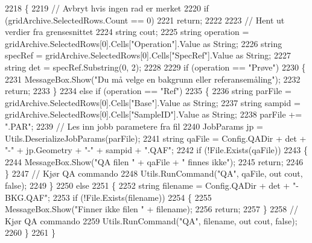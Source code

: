 \begin{DoxyCode}
2218         \{
2219             \textcolor{comment}{// Avbryt hvis ingen rad er merket}
2220             \textcolor{keywordflow}{if} (gridArchive.SelectedRows.Count == 0)
2221                 \textcolor{keywordflow}{return};
2222 
2223             \textcolor{comment}{// Hent ut verdier fra grensesnittet}
2224             \textcolor{keywordtype}{string} cout;
2225             \textcolor{keywordtype}{string} operation = gridArchive.SelectedRows[0].Cells[\textcolor{stringliteral}{"Operation"}].Value as String;
2226             \textcolor{keywordtype}{string} specRef = gridArchive.SelectedRows[0].Cells[\textcolor{stringliteral}{"SpecRef"}].Value as String;
2227             \textcolor{keywordtype}{string} det = specRef.Substring(0, 2);
2228 
2229             \textcolor{keywordflow}{if} (operation == \textcolor{stringliteral}{"Prøve"})
2230             \{
2231                 MessageBox.Show(\textcolor{stringliteral}{"Du må velge en bakgrunn eller referansemåling"});
2232                 \textcolor{keywordflow}{return};
2233             \}
2234             \textcolor{keywordflow}{else} \textcolor{keywordflow}{if} (operation == \textcolor{stringliteral}{"Ref"})
2235             \{
2236                 \textcolor{keywordtype}{string} parFile = gridArchive.SelectedRows[0].Cells[\textcolor{stringliteral}{"Base"}].Value as String;
2237                 \textcolor{keywordtype}{string} sampid = gridArchive.SelectedRows[0].Cells[\textcolor{stringliteral}{"SampleID"}].Value as String;
2238                 parFile += \textcolor{stringliteral}{".PAR"};
2239                 \textcolor{comment}{// Les inn jobb parametere fra fil}
2240                 JobParams jp = Utils.DeserializeJobParams(parFile);
2241                 \textcolor{keywordtype}{string} qaFile = Config.QADir + det + \textcolor{stringliteral}{"-"} + jp.Geometry + \textcolor{stringliteral}{"-"} + sampid + \textcolor{stringliteral}{".QAF"};
2242                 \textcolor{keywordflow}{if} (!File.Exists(qaFile))
2243                 \{
2244                     MessageBox.Show(\textcolor{stringliteral}{"QA filen "} + qaFile + \textcolor{stringliteral}{" finnes ikke"});
2245                     \textcolor{keywordflow}{return};
2246                 \}
2247                 \textcolor{comment}{// Kjør QA commando}
2248                 Utils.RunCommand(\textcolor{stringliteral}{"QA"}, qaFile, out cout, \textcolor{keyword}{false});
2249             \}
2250             \textcolor{keywordflow}{else}
2251             \{
2252                 \textcolor{keywordtype}{string} filename = Config.QADir + det + \textcolor{stringliteral}{"-BKG.QAF"};
2253                 \textcolor{keywordflow}{if} (!File.Exists(filename))
2254                 \{
2255                     MessageBox.Show(\textcolor{stringliteral}{"Finner ikke filen "} + filename);
2256                     \textcolor{keywordflow}{return};
2257                 \}
2258                 \textcolor{comment}{// Kjør QA commando}
2259                 Utils.RunCommand(\textcolor{stringliteral}{"QA"}, filename, out cout, \textcolor{keyword}{false});
2260             \}
2261         \}
\end{DoxyCode}
